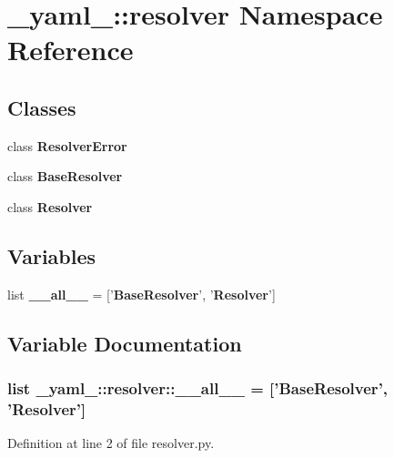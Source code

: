 \section{\_\-yaml\_\-::resolver Namespace Reference}
\label{namespace__yaml___1_1resolver}


\subsection*{Classes}
\begin{CompactItemize}
\item 
class {\bf ResolverError}
\item 
class {\bf BaseResolver}
\item 
class {\bf Resolver}
\end{CompactItemize}
\subsection*{Variables}
\begin{CompactItemize}
\item 
list {\bf \_\-\_\-all\_\-\_\-} = ['{\bf BaseResolver}', '{\bf Resolver}']
\end{CompactItemize}


\subsection{Variable Documentation}
\subsubsection{\setlength{\rightskip}{0pt plus 5cm}list {\bf \_\-yaml\_\-::resolver::\_\-\_\-all\_\-\_\-} = ['{\bf BaseResolver}', '{\bf Resolver}']\hspace{0.3cm}{\tt  [static]}}\label{namespace__yaml___1_1resolver_a035893282c536f6fcd8a4ebf8c868bc}




Definition at line 2 of file resolver.py.